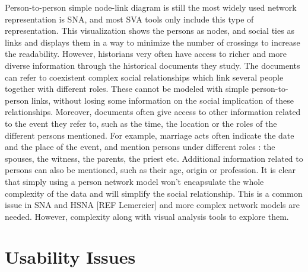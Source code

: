 Person-to-person simple node-link diagram is still the most widely used network representation is SNA, and most SVA tools only include this type of representation.
This visualization shows the persons as nodes, and social ties as links and displays them in a way to minimize the number of crossings to increase the readability.
However, historians very often have access to richer and more diverse information through the historical documents they study.
The documents can refer to coexistent complex social relationships which link several people together with different roles.
These cannot be modeled with simple person-to-person links, without losing some information on the social implication of these relationships.
Moreover, documents often give access to other information related to the event they refer to, such as the time, the location or the roles of the different persons mentioned.
For example, marriage acts often indicate the date and the place of the event, and mention persons under different roles : the spouses, the witness, the parents, the priest etc.
Additional information related to persons can also be mentioned, such as their age, origin or profession.
It is clear that simply using a person network model won’t encapsulate the whole complexity of the data and will simplify the social relationship. This is a common issue in SNA and HSNA [REF Lemercier] and more complex network models are needed. However, complexity
along with visual analysis tools to explore them.

\section{Usability Issues}

